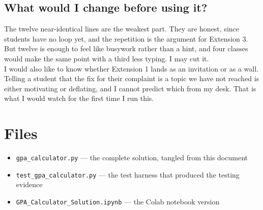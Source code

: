 \documentclass[11pt]{article}
\begin{document}
\subsection{What would I change before using it?}
\label{sec:org083555c}

The twelve near-identical lines are the weakest part. They are honest, since students have no loop yet, and the repetition is the argument for Extension 3. But twelve is enough to feel like busywork rather than a hint, and four classes would make the same point with a third less typing. I may cut it.\\

I would also like to know whether Extension 1 lands as an invitation or as a wall. Telling a student that the fix for their complaint is a topic we have not reached is either motivating or deflating, and I cannot predict which from my desk. That is what I would watch for the first time I run this.\\
\section{Files}
\label{sec:orgc547462}

\begin{itemize}
\item \texttt{gpa\_calculator.py} — the complete solution, tangled from this document\\
\item \texttt{test\_gpa\_calculator.py} — the test harness that produced the testing evidence\\
\item \texttt{GPA\_Calculator\_Solution.ipynb} — the Colab notebook version\\
\end{itemize}
\end{document}
